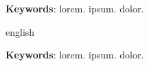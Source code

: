 \documentclass[
	12pt,				%
	openright,			%
	oneside,
	a4paper,			%
	sumario=tradicional,
	chapter=TITLE,		%
	section=TITLE,		%
	english,			%
	french,				%
	spanish,			%
	brazil				%
	]{ftex}
\begin{document}

\frenchspacing

\pretextual

\imprimircapa

\imprimirfolhaderosto*

\setlength{\absparsep}{16pt} %
\begin{resumo}

\lipsum[1] %

\textbf{Keywords}: lorem. ipsum. dolor.

\end{resumo}

\begin{resumo}[Abstract]
    \begin{otherlanguage*}{english}

\lipsum[2] %

\textbf{Keywords}: lorem. ipsum. dolor.

    \end{otherlanguage*}
\end{resumo}

\listoffigures*
\cleardoublepage

\listoftables*
\cleardoublepage
 
\renewcommand{\nomname}{\listadesiglasname}
\pdfbookmark[0]{\nomname}{las}
\makenomenclature
\printnomenclature
\cleardoublepage


\tableofcontents*
\cleardoublepage
\end{document}
